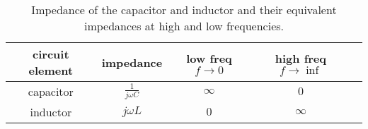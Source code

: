 \documentclass{ximera}
\begin{document}
\begin{table}[htbp]
\centering
\begin{tabular}{|c|c|c|c|c|} \hline
circuit element & impedance & low freq $f \to 0$& high freq $f \to \inf$   \\  \hline  
 capacitor     & $\frac{1}{j \omega C}$    & $\infty$ & $0$    \\  \hline       
 inductor & $j \omega L$              &    $0$   &       $\infty $             \\ \hline
\end{tabular}
\caption{Impedance of the capacitor and inductor and their equivalent impedances at high and low frequencies.}
\end{table}
\end{document}
